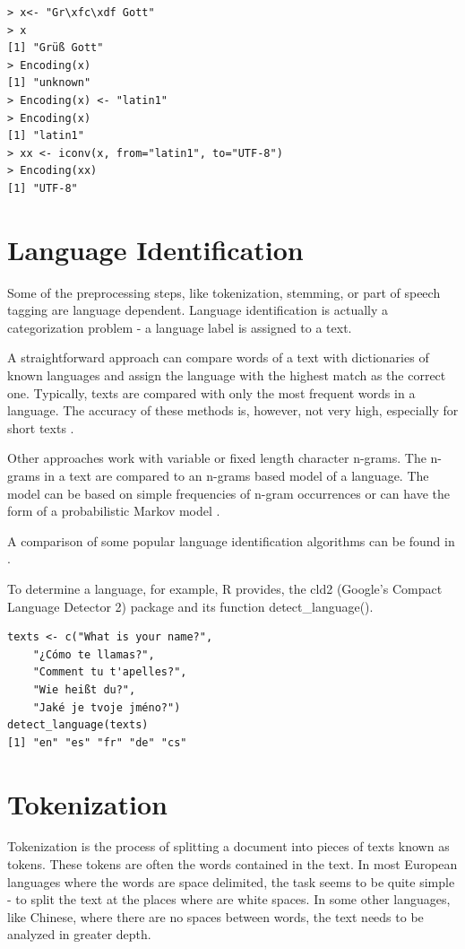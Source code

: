 \documentclass[11pt,openany,executivepaper]{book}
\begin{document}
\begin{verbatim}
> x<- "Gr\xfc\xdf Gott"
> x
[1] "Grüß Gott"
> Encoding(x)
[1] "unknown"
> Encoding(x) <- "latin1"
> Encoding(x)
[1] "latin1"
> xx <- iconv(x, from="latin1", to="UTF-8")
> Encoding(xx)
[1] "UTF-8"
\end{verbatim}

\section{Language Identification}
Some of the preprocessing steps, like tokenization, stemming, or part of speech tagging are language dependent. Language identification is actually a categorization problem - a language label is assigned to a text.

A straightforward approach can compare words of a text with dictionaries of known languages and assign the language with the highest match as the correct one. Typically, texts are compared with only the most frequent words in a language. The accuracy of these methods is, however, not very high, especially for short texts \cite{106}.

Other approaches work with variable or fixed length character n-grams. The n-grams in a text are compared to an n-grams based model of a language. The model can be based on simple frequencies of n-gram occurrences \cite{44} or can have the form of a probabilistic Markov model \cite{215}.

A comparison of some popular language identification algorithms can be found in \cite{131}.

To determine a language, for example, R provides, the cld2 (Google's Compact Language Detector 2) package and its function detect\_language().

\begin{verbatim}
texts <- c("What is your name?",
    "¿Cómo te llamas?",
    "Comment tu t'apelles?",
    "Wie heißt du?",
    "Jaké je tvoje jméno?")
detect_language(texts)
[1] "en" "es" "fr" "de" "cs"
\end{verbatim}

\section{Tokenization}
Tokenization is the process of splitting a document into pieces of texts known as tokens. These tokens are often the words contained in the text. In most European languages where the words are space delimited, the task seems to be quite simple - to split the text at the places where are white spaces. In some other languages, like Chinese, where there are no spaces between words, the text needs to be analyzed in greater depth.
\end{document}
